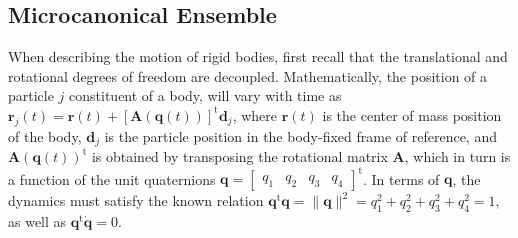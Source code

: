 \documentclass[aip,jcp,reprint,amsmath,amssymb]{revtex4-1}
\newcommand{\mt}[1]{\boldsymbol{\mathbf{#1}}}           %
\newcommand{\vt}[1]{\boldsymbol{\mathbf{#1}}}           %
\newcommand{\tr}[1]{#1^\text{t}}                        %
\begin{document}
\subsection{Microcanonical Ensemble}

When describing the motion of rigid bodies, first recall that the translational and rotational degrees of freedom are decoupled. Mathematically, the position of a particle $j$ constituent of a body, will vary with time as $\vt r_j(t) = \vt r(t) + \tr{[{\mt A}(\vt q(t))]}\vt d_j$, where $\vt r(t)$ is the center of mass position of the body, $\vt d_j$ is the particle position in the body-fixed frame of reference, and $\tr{\mt A(\vt q(t))}$ is obtained by transposing the rotational matrix $\mt A$, which in turn is a function of the unit quaternions $\vt q = \tr {[\begin{array}{cccc} q_1 & q_2 & q_3 & q_4 \end{array}]}$. In terms of $\vt q$, the dynamics must satisfy the known relation\cite{Goldstein2002} $\tr{\vt q}{\vt q} = \|\vt q\|^2 = q_1^2 + q_2^2 + q_3^2 + q_4^2 = 1$, as well as $\tr{\vt q}{\dot{\vt q}} = 0$.
\end{document}
